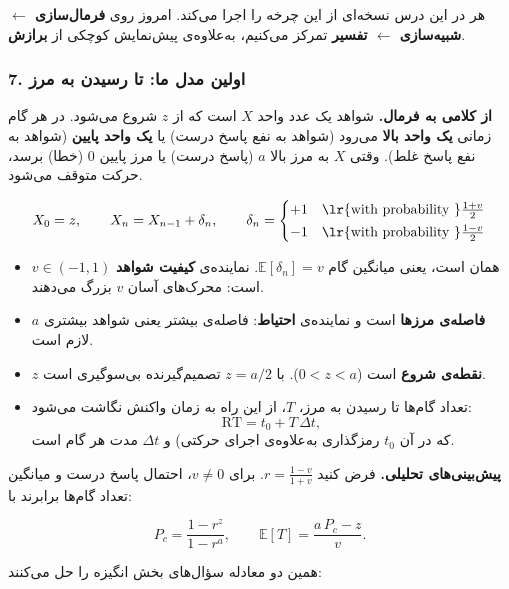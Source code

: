 هر  در این درس نسخه‌ای از این چرخه را اجرا می‌کند. امروز روی
\textbf{فرمال‌سازی \ensuremath{\leftarrow} شبیه‌سازی \ensuremath{\leftarrow} تفسیر} تمرکز می‌کنیم، به‌علاوه‌ی پیش‌نمایش
کوچکی از \textbf{برازش}.

\subsubsection{\texorpdfstring{7. اولین مدل ما:  تا
رسیدن به مرز}{7. اولین مدل ما: random walk تا رسیدن به مرز}}

\textbf{از کلامی به فرمال.} شواهد یک عدد واحد \(X\) است که از \(z\) شروع
می‌شود. در هر گام زمانی \textbf{یک واحد بالا} می‌رود (شواهد به نفع پاسخ
درست) یا \textbf{یک واحد پایین} (شواهد به نفع پاسخ غلط). وقتی \(X\) به
مرز بالا \(a\) (پاسخ درست) یا مرز پایین \(0\) (خطا) برسد، حرکت متوقف
می‌شود.

\[
X_0 = z, \qquad X_{n} = X_{n-1} + \delta_n, \qquad
\delta_n =
\begin{cases}
+1 & \text{\lr{with probability }} \tfrac{1+v}{2}\\[2pt]
-1 & \text{\lr{with probability }} \tfrac{1-v}{2}
\end{cases}
\]

\begin{itemize}
\tightlist
\item
  \(v \in (-1, 1)\) همان \textbf{} است، یعنی میانگین گام
  \(\mathbb{E}[\delta_n] = v\). نماینده‌ی \textbf{کیفیت شواهد} است:
  محرک‌های آسان \(v\) بزرگ می‌دهند.
\item
  \(a\) \textbf{فاصله‌ی مرزها}  است و نماینده‌ی
  \textbf{احتیاط}: فاصله‌ی بیشتر یعنی شواهد بیشتری لازم است.
\item
  \(z\) \textbf{نقطه‌ی شروع} است (\(0 < z < a\)). با \(z = a/2\)
  تصمیم‌گیرنده بی‌سوگیری است.
\item
  تعداد گام‌ها تا رسیدن به مرز، \(T\)، از این راه به زمان واکنش نگاشت
  می‌شود: \[
  \mathrm{RT} = t_0 + T\,\Delta t,
  \] که در آن \(t_0\) \textbf{}  رمزگذاری به‌علاوه‌ی اجرای حرکتی) و \(\Delta t\) مدت هر گام است.
\end{itemize}

\textbf{پیش‌بینی‌های تحلیلی.} فرض کنید \(r = \frac{1-v}{1+v}\). برای
\(v \neq 0\)، احتمال پاسخ درست و میانگین تعداد گام‌ها برابرند با:

\[
P_c = \frac{1 - r^{z}}{1 - r^{a}}, \qquad
\mathbb{E}[T] = \frac{a\,P_c - z}{v}.
\]

همین دو معادله سؤال‌های بخش انگیزه را حل می‌کنند:

